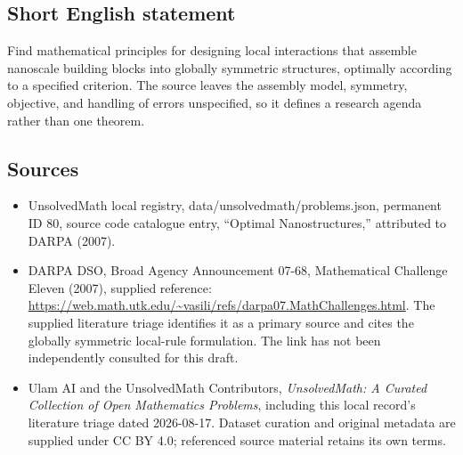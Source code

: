 \documentclass[11pt]{article}
\begin{document}
\subsection{Short English statement}
Find mathematical principles for designing local interactions that assemble nanoscale building blocks into globally symmetric structures, optimally according to a specified criterion. The source leaves the assembly model, symmetry, objective, and handling of errors unspecified, so it defines a research agenda rather than one theorem.
\subsection{Sources}
\begin{itemize}
\item UnsolvedMath local registry, data/unsolvedmath/problems.json, permanent ID 80, source code catalogue entry, ``Optimal Nanostructures,'' attributed to DARPA (2007).
\item DARPA DSO, Broad Agency Announcement 07-68, Mathematical Challenge Eleven (2007), supplied reference: \url{https://web.math.utk.edu/~vasili/refs/darpa07.MathChallenges.html}. The supplied literature triage identifies it as a primary source and cites the globally symmetric local-rule formulation. The link has not been independently consulted for this draft.
\item Ulam AI and the UnsolvedMath Contributors, \emph{UnsolvedMath: A Curated Collection of Open Mathematics Problems}, including this local record's literature triage dated 2026-08-17. Dataset curation and original metadata are supplied under CC BY 4.0; referenced source material retains its own terms.
\end{itemize}
\end{document}
